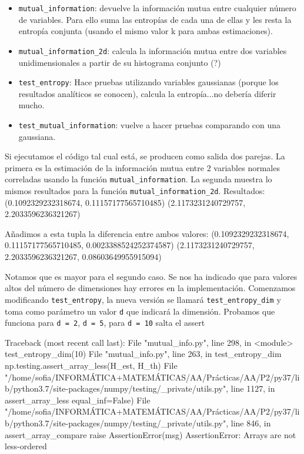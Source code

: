 \documentclass[10pt,a4paper]{article} %
\theoremstyle{definition}
\begin{document}
\begin{itemize}
\item \texttt{mutual\_information}: devuelve la información mutua entre cualquier número de variables. Para ello suma las entropías de cada una de ellas y les resta la entropía conjunta (usando el mismo valor k para ambas estimaciones).

\item \texttt{mutual\_information\_2d}: calcula la información mutua entre dos variables unidimensionales a partir de su histograma conjunto (?)

\item \texttt{test\_entropy}: Hace pruebas utilizando variables gaussianas (porque los resultados analíticos se conocen), calcula la entropía...no debería diferir mucho.

\item \texttt{test\_mutual\_information}: vuelve a hacer pruebas comparando con una gaussiana.
  
\end{itemize} 

Si ejecutamos el código tal cual está, se producen como salida dos parejas. La primera es la estimación de la información mutua entre 2 variables normales correladas usando la función \texttt{mutual\_information}. La segunda muestra lo mismos resultados para la función \texttt{mutual\_information\_2d}.
Resultados: (0.1092329232318674, 0.11157177565710485)
(2.1173231240729757, 2.2033596236321267)

Añadimos a esta tupla la diferencia entre ambos valores:
(0.1092329232318674, 0.11157177565710485, 0.0023388524252374587)
(2.1173231240729757, 2.2033596236321267, 0.08603649955915094)

Notamos que es mayor para el segundo caso. Se nos ha indicado que para valores altos del número de dimensiones hay errores en la implementación. Comenzamos modificando \texttt{test\_entropy}, la nueva versión se llamará \texttt{test\_entropy\_dim} y toma como parámetro un valor \texttt{d} que indicará la dimensión. Probamos que funciona para \texttt{d = 2}, \texttt{d = 5}, para \texttt{d = 10} salta el assert

Traceback (most recent call last):
  File "mutual_info.py", line 298, in <module>
    test_entropy_dim(10)
  File "mutual_info.py", line 263, in test_entropy_dim
    np.testing.assert_array_less(H_est, H_th)
  File "/home/sofia/INFORMÁTICA+MATEMÁTICAS/AA/Prácticas/AA/P2/py37/lib/python3.7/site-packages/numpy/testing/_private/utils.py", line 1127, in assert_array_less
    equal_inf=False)
  File "/home/sofia/INFORMÁTICA+MATEMÁTICAS/AA/Prácticas/AA/P2/py37/lib/python3.7/site-packages/numpy/testing/_private/utils.py", line 846, in assert_array_compare
    raise AssertionError(msg)
AssertionError: 
Arrays are not less-ordered
\end{document}
